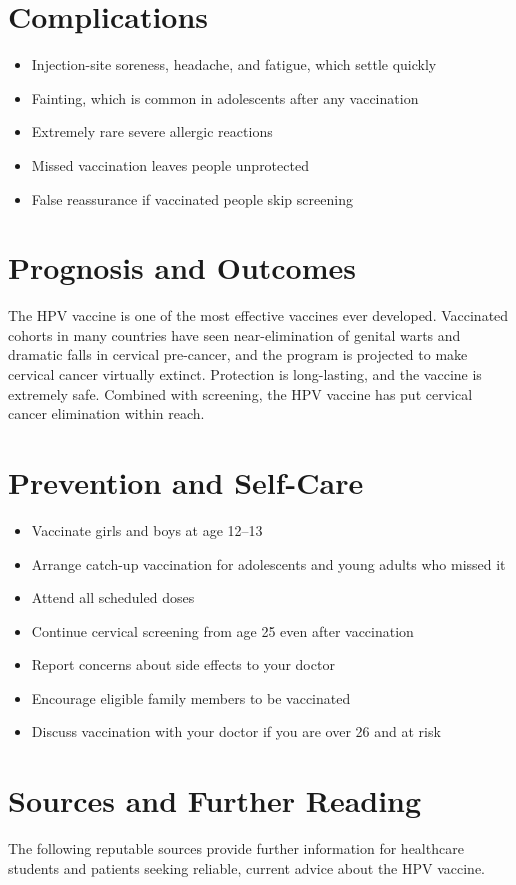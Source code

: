 \section*{Complications}
\begin{itemize}
    \item Injection-site soreness, headache, and fatigue, which settle quickly
    \item Fainting, which is common in adolescents after any vaccination
    \item Extremely rare severe allergic reactions
    \item Missed vaccination leaves people unprotected
    \item False reassurance if vaccinated people skip screening
\end{itemize}

\section*{Prognosis and Outcomes}
The HPV vaccine is one of the most effective vaccines ever developed. Vaccinated cohorts in many countries have seen near-elimination of genital warts and dramatic falls in cervical pre-cancer, and the program is projected to make cervical cancer virtually extinct. Protection is long-lasting, and the vaccine is extremely safe. Combined with screening, the HPV vaccine has put cervical cancer elimination within reach.

\section*{Prevention and Self-Care}
\begin{itemize}
    \item Vaccinate girls and boys at age 12--13
    \item Arrange catch-up vaccination for adolescents and young adults who missed it
    \item Attend all scheduled doses
    \item Continue cervical screening from age 25 even after vaccination
    \item Report concerns about side effects to your doctor
    \item Encourage eligible family members to be vaccinated
    \item Discuss vaccination with your doctor if you are over 26 and at risk
\end{itemize}

\section*{Sources and Further Reading}
The following reputable sources provide further information for healthcare students and patients seeking reliable, current advice about the HPV vaccine.

